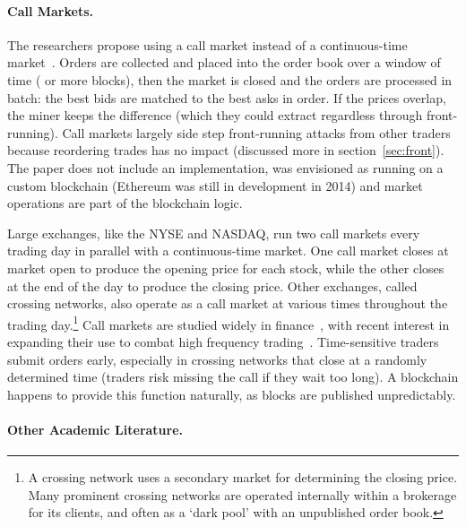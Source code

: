 \paragraph{Call Markets.} The researchers propose using a call market instead of a continuous-time market~\cite{clark2014decentralizing}. Orders are collected and placed into the order book over a window of time ( or more blocks), then the market is closed and the orders are processed in batch: the best bids are matched to the best asks in order. If the prices overlap, the miner keeps the difference (which they could extract regardless through front-running). Call markets largely side step front-running attacks from other traders because reordering trades has no impact (discussed more in section~\ref{sec:front}). The paper does not include an implementation, was envisioned as running on a custom blockchain (Ethereum was still in development in 2014) and market operations are part of the blockchain logic.

Large exchanges, like the NYSE and NASDAQ, run two call markets every trading day in parallel with a continuous-time market. One call market closes at market open to produce the opening price for each stock, while the other closes at the end of the day to produce the closing price. Other exchanges, called crossing networks, also operate as a call market at various times throughout the trading day.\footnote{A crossing network uses a secondary market for determining the closing price. Many prominent crossing networks are operated internally within a brokerage for its clients, and often as a `dark pool' with an unpublished order book.} Call markets are studied widely in finance~\cite{Har03}, with recent interest in expanding their use to combat high frequency trading~\cite{budish2015high,aquilina2020quantifying}. Time-sensitive traders submit orders early, especially in crossing networks that close at a randomly determined time (traders risk missing the call if they wait too long). A blockchain happens to provide this function naturally, as blocks are published unpredictably. %

\paragraph{Other Academic Literature.} 

